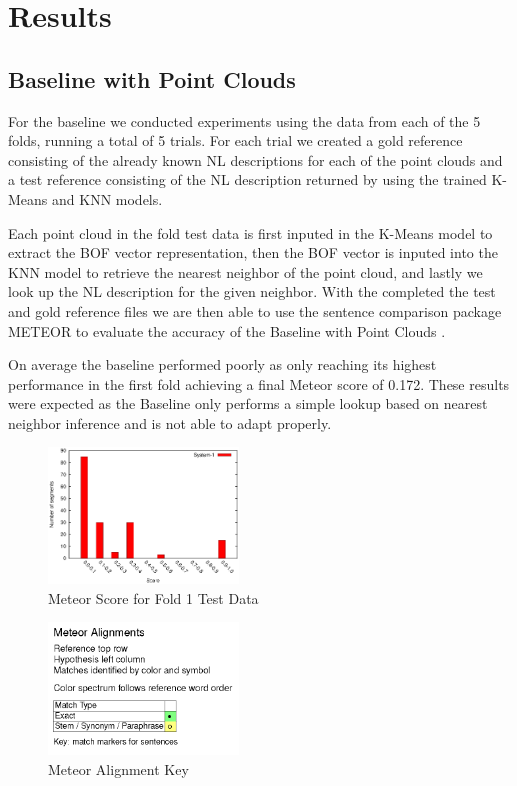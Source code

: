 \documentclass[letterpaper, 12 pt, conference]{ieeeconf}
\begin{document}
\section{Results}

\subsection{Baseline with Point Clouds}

For the baseline we conducted experiments using the data from each of the 5 folds, running a total of 5 trials. For each trial we created a gold reference consisting of the already known NL descriptions for each of the point clouds and a test reference consisting of the NL description returned by using the trained K-Means and KNN models.

Each point cloud in the fold test data is first inputed in the K-Means model to extract the BOF vector representation, then the BOF vector is inputed into the KNN model to retrieve the nearest neighbor of the point cloud, and lastly we look up the NL description for the given neighbor. With the completed the test and gold reference files we are then able to use the sentence comparison package METEOR to evaluate the accuracy of the Baseline with Point Clouds .

On average the baseline performed poorly as only reaching its highest performance in the first fold achieving a final Meteor score of 0.172. These results were expected as the Baseline only performs a simple lookup based on nearest neighbor inference and is not able to adapt properly.

\begin{figure}[htb!]
  \centering
  \includegraphics[width=0.45\textwidth]{fold_1_score}
  \caption{Meteor Score for Fold 1 Test Data}
  \label{fig:fold_1_score}
\end{figure}

\begin{figure}[htb!]
  \centering
  \includegraphics[width=0.45\textwidth]{meteor_alignment_key}
  \caption{Meteor Alignment Key}
  \label{fig:meteor_alignment_key}
\end{figure}
\end{document}
